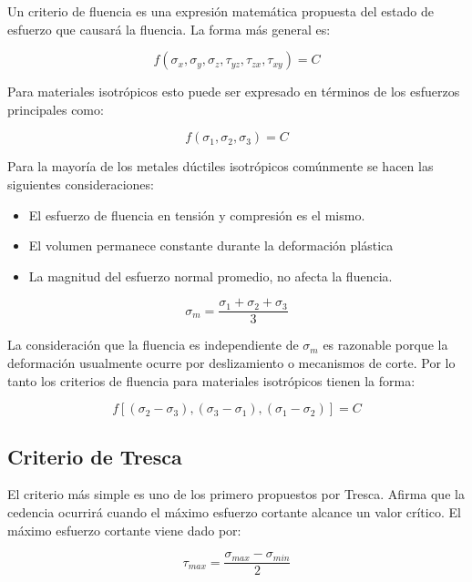 Un criterio de fluencia es una expresión matemática propuesta del estado de esfuerzo que causará la fluencia. La forma más general es:

\begin{equation}
f(\sigma_x,\sigma_y, \sigma_z, \tau_{yz}, \tau_{zx}, \tau_{xy} ) = C 
\end{equation}

Para materiales isotrópicos esto puede ser expresado en términos de los esfuerzos principales como:

\begin{equation}
f(\sigma_1,\sigma_2,\sigma_3 )=C
\end{equation}

Para la mayoría de los metales dúctiles isotrópicos comúnmente se hacen las siguientes consideraciones:

\begin{itemize}
\item El esfuerzo de fluencia en tensión y compresión es el mismo.
\item El volumen permanece constante durante la deformación plástica
\item La magnitud del esfuerzo normal promedio, no afecta la fluencia.
\end{itemize}

\begin{equation}
\sigma_m=\frac{\sigma_1+\sigma_2+\sigma_3}{3}
\end{equation}

La consideración que la fluencia es independiente de $\sigma_m$ es razonable porque la deformación usualmente ocurre por deslizamiento o mecanismos de corte. Por lo tanto los criterios de fluencia para materiales isotrópicos tienen la forma:

\begin{equation}
f[(\sigma_2-\sigma_3 ),(\sigma_3-\sigma_1 ),(\sigma_1-\sigma_2 )] = C
\end{equation}

\subsection{Criterio de Tresca}

El criterio más simple es uno de los primero propuestos por Tresca. Afirma que la cedencia ocurrirá cuando el máximo 
esfuerzo cortante alcance un valor crítico. El máximo esfuerzo cortante viene dado por:

\begin{equation}
\tau_{max} = \frac{\sigma_{max}-\sigma_{min}}{2}
\end{equation}


